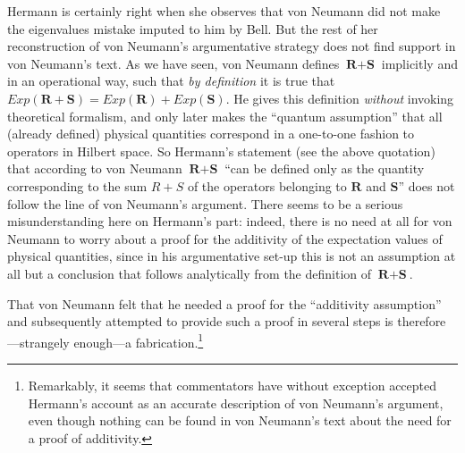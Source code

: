 \documentclass[12pt]{article}
\begin{document}
Hermann is certainly right when she observes that von Neumann did not make the eigenvalues mistake imputed to him by Bell. But the rest of her reconstruction of von Neumann's argumentative strategy does not find support in von Neumann's text. As we have seen, von Neumann defines $\textbf{R} + \textbf{S}$ implicitly and in an operational way, such that \emph{by definition} it is true that $Exp(\textbf{R} + \textbf{S}) = Exp(\textbf{R}) + Exp(\textbf{S})$. He gives this definition \emph{without} invoking theoretical formalism, and only later makes the ``quantum assumption'' that all (already defined) physical quantities correspond in a one-to-one fashion to operators in Hilbert space. So Hermann's statement (see the above quotation) that according to von Neumann $\textbf{R} + \textbf{S}$ ``can be defined only as the quantity corresponding to the sum $R + S$ of the operators belonging to $\textbf{R}$ and $\textbf{S}$'' does not follow the line of von Neumann's argument. There seems to be a serious misunderstanding here on Hermann's part: indeed, there is no need at all for von Neumann to worry about a proof for the additivity of the expectation values of physical quantities, since in his argumentative set-up this is not an assumption at all but a conclusion  that follows analytically from the definition of $\textbf{R} + \textbf{S}$.

That von Neumann felt that he needed a proof for the ``additivity assumption'' and subsequently attempted to provide such a proof in several steps is therefore---strangely enough---a fabrication.\footnote{Remarkably, it seems that commentators have without exception accepted Hermann's account as an accurate description of von Neumann's argument, even though nothing can be found in von Neumann's text about the need for a proof of additivity.}
\end{document}
